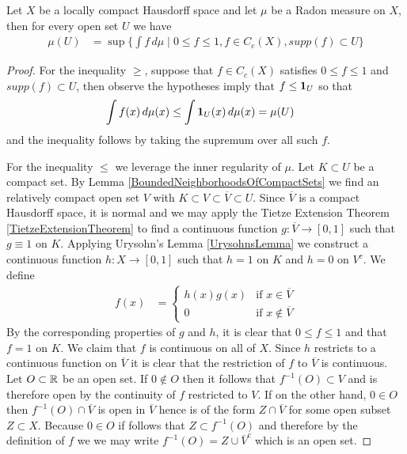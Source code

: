 \begin{lem}\label{RieszMarkovUniquenessOnOpen}Let $X$ be a locally compact Hausdorff space and let $\mu$
  be a Radon measure on $X$, then for every open set $U$ we have
\begin{align*}
\mu(U) &= \sup \lbrace \int f \, d\mu \mid 0 \leq f \leq 1, f \in
C_c(X), supp(f) \subset U \rbrace
\end{align*}
\end{lem}
\begin{proof}
For the inequality $\geq$, suppose that $f \in C_c(X)$ satisfies $0
\leq f \leq 1$ and $supp(f) \subset U$, then observe the hypotheses
imply that $f \leq \textbf{1}_{U}$ so that
\begin{align*}
\int f(x) \, d\mu(x) &\leq \int \textbf{1}_{U}(x) \, d\mu(x) = \mu(U)
\end{align*}
and the inequality follows by taking the supremum over all such $f$.

For the inequality $\leq$ we leverage the inner regularity of $\mu$.
Let $K \subset U$ be a compact set.  By Lemma
\ref{BoundedNeighborhoodsOfCompactSets} we find an relatively compact
open set $V$ with $K \subset V \subset \overline{V} \subset U$.  Since
$\overline{V}$ is a compact Hausdorff space, it is normal and we may
apply the Tietze Extension Theorem \ref{TietzeExtensionTheorem} to
find a continuous function $g : \overline{V} \to [0,1]$ such that $g
\equiv 1$ on $K$.  Applying Urysohn's Lemma \ref{UrysohnsLemma} we
construct a continuous function $h : X \to [0,1]$ such that $h = 1$ on
$K$ and $h=0$ on $V^c$.  We define
\begin{align*}
f(x) &= \begin{cases}
h(x) g(x) & \text{if $x \in \overline{V}$} \\
0 & \text{if $x \notin \overline{V}$}
\end{cases}
\end{align*}
By the corresponding properties of $g$ and $h$, it is clear that $0 \leq f \leq 1$ and that $f=1$ on $K$.  We claim that $f$ is continuous on all of $X$.  Since $h$ restricts to a continuous function
on $\overline{V}$ it is clear that the restriction of $f$ to
$\overline{V}$ is continuous.  Let $O \subset \mathbb{R}$ be an open
set.  If $0 \notin O$ then it follows that $f^{-1}(O) \subset V$ and
is therefore open by the continuity of $f$ restricted to $V$.  If on
the other hand, $0 \in O$ then $f^{-1}(O) \cap \overline{V}$ is open
in $\overline{V}$ hence is of the form $Z \cap \overline{V}$ for some
open subset $Z \subset X$.  Because $0 \in O$ if follows that $Z
\subset f^{-1}(O)$ and therefore by the definition of $f$ we we may
write $f^{-1}(O) = Z \cup \overline{V}^c$ which is an open set.


\end{proof}
